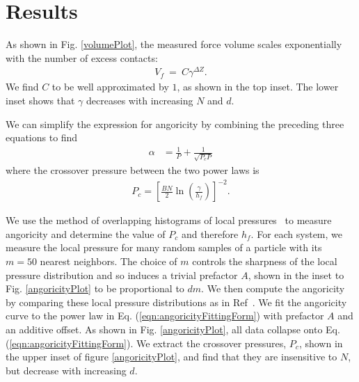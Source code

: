 \section{Results}
As shown in Fig. \ref{volumePlot}, the measured force volume scales exponentially with the number of excess contacts:
%
\begin{align}
 \label{eqn:forceVolume}
 V_f~=~C\gamma ^ {\Delta Z}.
\end{align}
%
We find $C$ to be well approximated by $1$, as shown in the top inset. The lower inset shows that $\gamma$ decreases with increasing $N$ and $d$. 

We can simplify the expression for angoricity by combining the preceding three equations to find
%
\begin{align}
\label{eqn:angoricityFittingForm}
\alpha &= \frac{1}{P} + \frac{1}{\sqrt{P_c P}} 
\end{align}
%
where the crossover pressure between the two power laws is
%
\begin{align} 
\label{pc_equation}
P_c=\left[\frac{BN}{2} \ln\left(\frac{\gamma}{h_f}\right)\right]^{-2}.
\end{align} 
%

We use the method of overlapping histograms of local pressures~\cite{bennett_efficient_1976,mcnamara_measurement_2009,bililign_protocol_2019} to measure angoricity and determine the value of $P_c$ and therefore $h_f$. For each system, we measure the local pressure for many random samples of a particle with its $m=50$ nearest neighbors. The choice of $m$ controls the sharpness of the local pressure distribution and so induces a trivial prefactor $A$, shown in the inset to Fig. \ref{angoricityPlot} to be proportional to $dm$. We then compute the angoricity by comparing these local pressure distributions as in Ref~\cite{bililign_protocol_2019}. We fit the angoricity curve to the power law in Eq. (\ref{eqn:angoricityFittingForm}) with prefactor $A$ and an additive offset. As shown in Fig. \ref{angoricityPlot}, all data collapse onto Eq. (\ref{eqn:angoricityFittingForm}).  We extract the crossover pressures, $P_c$, shown in the upper inset of figure \ref{angoricityPlot}, and find that they are insensitive to $N$, but decrease with increasing $d$.

